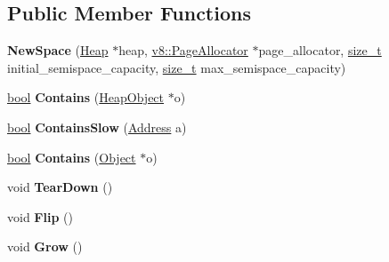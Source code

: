 \subsection*{Public Member Functions}
\begin{DoxyCompactItemize}
\item 
\mbox{\label{classv8_1_1internal_1_1NewSpace_a72316b782b2b16a9a58c01be5e296240}} 
{\bfseries New\+Space} (\mbox{\hyperlink{classv8_1_1internal_1_1Heap}{Heap}} $\ast$heap, \mbox{\hyperlink{classv8_1_1PageAllocator}{v8\+::\+Page\+Allocator}} $\ast$page\+\_\+allocator, \mbox{\hyperlink{classsize__t}{size\+\_\+t}} initial\+\_\+semispace\+\_\+capacity, \mbox{\hyperlink{classsize__t}{size\+\_\+t}} max\+\_\+semispace\+\_\+capacity)
\item 
\mbox{\label{classv8_1_1internal_1_1NewSpace_af190d736985da39994ed68e87e8f6e63}} 
\mbox{\hyperlink{classbool}{bool}} {\bfseries Contains} (\mbox{\hyperlink{classv8_1_1internal_1_1HeapObject}{Heap\+Object}} $\ast$o)
\item 
\mbox{\label{classv8_1_1internal_1_1NewSpace_a1b7221040579582225dc9b7e919ffaf5}} 
\mbox{\hyperlink{classbool}{bool}} {\bfseries Contains\+Slow} (\mbox{\hyperlink{classuintptr__t}{Address}} a)
\item 
\mbox{\label{classv8_1_1internal_1_1NewSpace_a3eb5dbab1f2ac9f6bc263e2e9549f5bf}} 
\mbox{\hyperlink{classbool}{bool}} {\bfseries Contains} (\mbox{\hyperlink{classv8_1_1internal_1_1Object}{Object}} $\ast$o)
\item 
\mbox{\label{classv8_1_1internal_1_1NewSpace_a3c260c86d0c22230141dcfa58bd291b2}} 
void {\bfseries Tear\+Down} ()
\item 
\mbox{\label{classv8_1_1internal_1_1NewSpace_a2483751f06066ed3004a2cc72ec7fb9f}} 
void {\bfseries Flip} ()
\item 
\mbox{\label{classv8_1_1internal_1_1NewSpace_ab3f396ae74206828b53672f496b676b3}} 
void {\bfseries Grow} ()
\item 
\mbox{\label{classv8_1_1internal_1_1NewSpace_a96e448968f2591e48f8f8452cbd01d72}} 

\end{DoxyCompactItemize}
